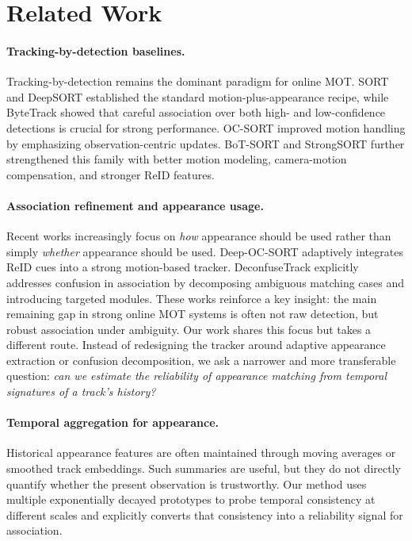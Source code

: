\section{Related Work}
\paragraph{Tracking-by-detection baselines.}
Tracking-by-detection remains the dominant paradigm for online MOT. SORT \cite{bewley2016sort} and DeepSORT \cite{wojke2017deepsort} established the standard motion-plus-appearance recipe, while ByteTrack \cite{zhang2021bytetrack} showed that careful association over both high- and low-confidence detections is crucial for strong performance. OC-SORT \cite{cao2022ocsort} improved motion handling by emphasizing observation-centric updates. BoT-SORT \cite{aharon2022botsort} and StrongSORT \cite{du2022strongsort} further strengthened this family with better motion modeling, camera-motion compensation, and stronger ReID features.

\paragraph{Association refinement and appearance usage.}
Recent works increasingly focus on \emph{how} appearance should be used rather than simply \emph{whether} appearance should be used. Deep-OC-SORT \cite{maggiolino2023deepocsort} adaptively integrates ReID cues into a strong motion-based tracker. DeconfuseTrack \cite{huang2024deconfusetrack} explicitly addresses confusion in association by decomposing ambiguous matching cases and introducing targeted modules. These works reinforce a key insight: the main remaining gap in strong online MOT systems is often not raw detection, but robust association under ambiguity. Our work shares this focus but takes a different route. Instead of redesigning the tracker around adaptive appearance extraction or confusion decomposition, we ask a narrower and more transferable question: \emph{can we estimate the reliability of appearance matching from temporal signatures of a track's history?}

\paragraph{Temporal aggregation for appearance.}
Historical appearance features are often maintained through moving averages or smoothed track embeddings. Such summaries are useful, but they do not directly quantify whether the present observation is trustworthy. Our method uses multiple exponentially decayed prototypes to probe temporal consistency at different scales and explicitly converts that consistency into a reliability signal for association.

